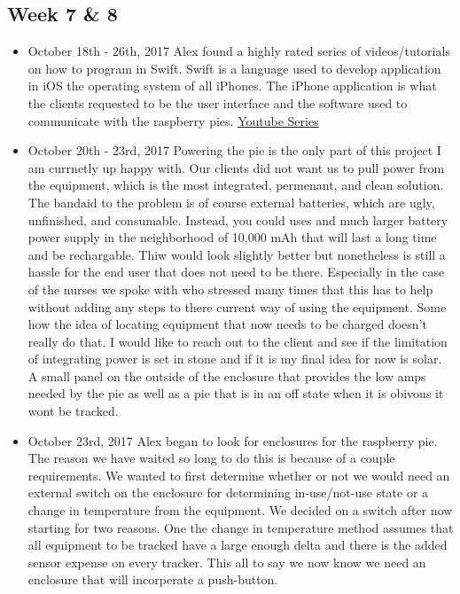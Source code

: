 \documentclass[12pt]{article}
\begin{document}
	\subsection{Week 7 \& 8}
		\begin{itemize}
			\item October 18th - 26th, 2017 Alex found a highly rated series of videos/tutorials on how to program in Swift.  Swift is a language used to develop application in iOS the operating system of all iPhones.  The iPhone application is what the clients requested to be the user interface and the software used to communicate with the raspberry pies. \href{https://www.youtube.com/watch?v=83WXmhin_LU}{Youtube Series}
			\item October 20th - 23rd, 2017 Powering the pie is the only part of this project I am currnetly up happy with.  Our clients did not want us to pull power from the equipment, which is the most integrated, permenant, and clean solution.  The bandaid to the problem is of course external batteries, which are ugly, unfinished, and consumable.  Instead, you could uses and much larger battery power supply in the neighborhood of 10,000 mAh that will last a long time and be rechargable. Thiw would look slightly better but nonetheless is still a hassle for the end user that does not need to be there.  Especially in the case of the nurses we spoke with who stressed many times that this has to help without adding any steps to there current way of using the equipment.  Some how the idea of locating equipment that now needs to be charged doesn't really do that.  I would like to reach out to the client and see if the limitation of integrating power is set in stone and if it is my final idea for now is solar.  A small panel on the outside of the enclosure that provides the low amps needed by the pie as well as a pie that is in an off state when it is obivous it wont be tracked.
			\item October 23rd, 2017 Alex began to look for enclosures for the raspberry pie.  The reason we have waited so long to do this is because of a couple requirements.  We wanted to first determine whether or not we would need an external switch on the enclosure for determining in-use/not-use state or a change in temperature from the equipment.  We decided on a switch after now starting for two reasons.  One the change in temperature method assumes that all equipment to be tracked have a large enough delta and there is the added sensor expense on every tracker.  This all to say we now know we need an enclosure that will incorperate a push-button.

\end{itemize}
\end{document}
